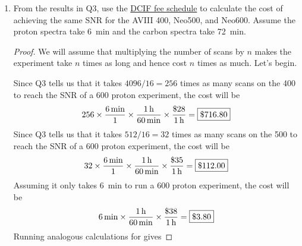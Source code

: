 \documentclass[../psets.tex]{subfiles}
\begin{document}
\begin{enumerate}
\begin{proof}
\begin{equation*}
            \left\lceil 4096\cdot\left( \frac{54.98}{28.86} \right)^2 \right\rceil = \lceil 14866 \rceil = \fbox{16384\,\text{scans}}
        \end{equation*}
        To achieve the same SNR on a \SI{500}{\mega\hertz}  spectrum as on a \SI{600}{\mega\hertz}  spectrum, you would need
        \begin{equation*}
            \left\lceil 4096\cdot\left( \frac{54.98}{43.00} \right)^2 \right\rceil = \lceil 6697 \rceil = \fbox{8192\,\text{scans}}
        \end{equation*}
    \end{proof}
    \item From the results in Q3, use the \href{https://chemistry.mit.edu/facilities-and-centers/department-of-chemistry-instrumentation-facility-dcif/}{DCIF fee schedule} to calculate the cost of achieving the same SNR for the AVIII 400, Neo500, and Neo600. Assume the proton spectra take \SI{6}{\minute} and the carbon spectra take \SI{72}{\minute}.
    \begin{proof}
        We will assume that multiplying the number of scans by $n$ makes the experiment take $n$ times as long and hence cost $n$ times as much. Let's begin.\par
        Since Q3 tells us that it takes $4096/16=256$ times as many scans on the 400 to reach the SNR of a 600 proton experiment, the cost will be
        \begin{equation*}
            256\times\frac{\SI{6}{\minute}}{1}\times\frac{\SI{1}{\hour}}{\SI{60}{\minute}}\times\frac{\$28}{\SI{1}{\hour}} = \fbox{\$716.80}
        \end{equation*}
        Since Q3 tells us that it takes $512/16=32$ times as many scans on the 500 to reach the SNR of a 600 proton experiment, the cost will be
        \begin{equation*}
            32\times\frac{\SI{6}{\minute}}{1}\times\frac{\SI{1}{\hour}}{\SI{60}{\minute}}\times\frac{\$35}{\SI{1}{\hour}} = \fbox{\$112.00}
        \end{equation*}
        Assuming it only takes \SI{6}{\minute} to run a 600 proton experiment, the cost will be
        \begin{equation*}
            \SI{6}{\minute}\times\frac{\SI{1}{\hour}}{\SI{60}{\minute}}\times\frac{\$38}{\SI{1}{\hour}} = \fbox{\$3.80}
        \end{equation*}
        Running analogous calculations for  gives 

\end{proof}
\end{enumerate}
\end{document}
